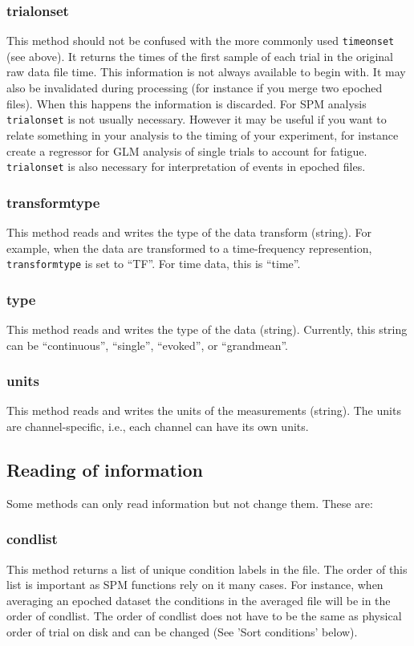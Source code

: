 \subsubsection{trialonset}
This method should not be confused with the more commonly used \texttt{timeonset} (see above). It returns the times of the first sample of each trial in the original raw data file time. This information is not always available to begin with. It may also be invalidated during processing (for instance if you merge two epoched files). When this happens the information is discarded. For SPM analysis \texttt{trialonset} is not usually necessary. However it may be useful if you want to relate something in your analysis to the timing of your experiment, for instance create a regressor for GLM analysis of single trials to account for fatigue. \texttt{trialonset} is also necessary for interpretation of events in epoched files.

\subsubsection{transformtype}
This method reads and writes the type of the data transform (string). For example, when the data are transformed to a time-frequency represention, \texttt{transformtype} is set to ``TF''. For time data, this is ``time''.

\subsubsection{type}
This method reads and writes the type of the data (string). Currently, this string can be ``continuous'', ``single'', ``evoked'', or ``grandmean''.

\subsubsection{units}
This method reads and writes the units of the measurements (string). The units are channel-specific, i.e., each channel can have its own units.

\subsection{Reading of information}
Some methods can only read information but not change them. These are:

\subsubsection{condlist}
This method returns a list of unique condition labels in the file. The order of this list is important as SPM functions rely on it many cases. For instance, when averaging an epoched dataset the conditions in the averaged file will be in the order of condlist. The order of condlist does not have to be the same as physical order of trial on disk and can be changed (See 'Sort conditions' below).

